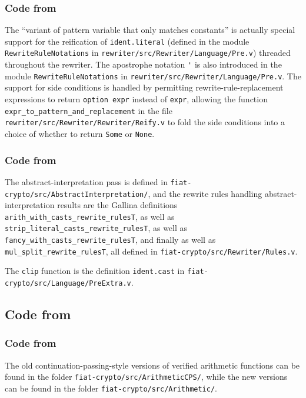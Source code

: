 \documentclass[a4paper,USenglish,cleveref,autoref,thm-restate]{lipics-v2021}
\begin{document}
\subsubsection{Code from }

The ``variant of pattern variable that only matches constants'' is actually special support for the reification of \verb|ident.literal| (defined in the module \verb|RewriteRuleNotations| in \texttt{rewriter/src/Rewriter/Language/Pre.v}) threaded throughout the rewriter.
The apostrophe notation \verb|'| is also introduced in the module \verb|RewriteRuleNotations| in \texttt{rewriter/src/Rewriter/Language/Pre.v}.
The support for side conditions is handled by permitting rewrite-rule-replacement expressions to return \verb|option expr| instead of \verb|expr|, allowing the function \verb|expr_to_pattern_and_replacement| in the file \texttt{rewriter/src/Rewriter/Rewriter/Reify.v} to fold the side conditions into a choice of whether to return \verb|Some| or \verb|None|.

\subsubsection{Code from }

The abstract-interpretation pass is defined in \texttt{fiat-crypto/src/AbstractInterpretation/}, and the rewrite rules handling abstract-interpretation results are the Gallina definitions \verb|arith_with_casts_rewrite_rulesT|, as well as \verb|strip_literal_casts_rewrite_rulesT|, as well as \verb|fancy_with_casts_rewrite_rulesT|, and finally as well as \verb|mul_split_rewrite_rulesT|, all defined in \texttt{fiat-crypto/src/Rewriter/Rules.v}.

The \verb|clip| function is the definition \verb|ident.cast| in \texttt{fiat-crypto/src/Language/PreExtra.v}.

\subsection{Code from }

\subsubsection{Code from }
The old continuation-passing-style versions of verified arithmetic functions can be found in the folder \texttt{fiat-crypto/src/ArithmeticCPS/}, while the new versions can be found in the folder \texttt{fiat-crypto/src/Arithmetic/}.
\end{document}
